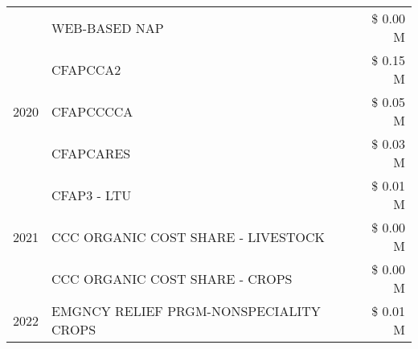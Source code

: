 \begin{tabular}{llr}
 & WEB-BASED NAP & \$ 0.00 M \\
\cline{1-3}
\multirow[t]{3}{*}{2020} & CFAPCCA2 & \$ 0.15 M \\
 & CFAPCCCCA & \$ 0.05 M \\
 & CFAPCARES & \$ 0.03 M \\
\cline{1-3}
\multirow[t]{3}{*}{2021} & CFAP3 - LTU & \$ 0.01 M \\
 & CCC ORGANIC COST SHARE - LIVESTOCK & \$ 0.00 M \\
 & CCC ORGANIC COST SHARE - CROPS & \$ 0.00 M \\
\cline{1-3}
2022 & EMGNCY RELIEF PRGM-NONSPECIALITY CROPS & \$ 0.01 M \\
\cline{1-3}
\bottomrule
\end{tabular}
